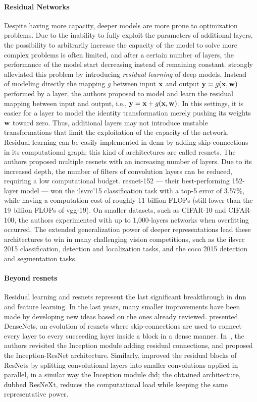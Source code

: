 \paragraph{Residual Networks}
Despite having more capacity, deeper models are more prone to optimization problems.
Due to the inability to fully exploit the parameters of additional layers, the possibility to arbitrarily increase the capacity of the model to solve more complex problems is often limited, and after a certain number of layers, the performance of the model start decreasing instead of remaining constant.
\citet{he2016deep} strongly alleviated this problem by introducing \emph{residual learning} of deep models.
Instead of modeling directly the mapping $g$ between input $\mathbf{x}$ and output $\mathbf{y} = g(\mathbf{x}, \mathbf{w})$ performed by a layer, the authors proposed to model and learn the residual mapping between input and output, i.e., $\mathbf{y} = \mathbf{x} + g(\mathbf{x}, \mathbf{w})$.
In this settings, it is easier for a layer to model the identity transformation merely pushing its weights $\mathbf{w}$ toward zero.
Thus, additional layers may not introduce unstable transformations that limit the exploitation of the capacity of the network.
Residual learning can be easily implemented in \gls{dcnn} by adding skip-connections in its computational graph;
this kind of architectures are called \glspl{resnet}.
The authors proposed multiple \glspl{resnet} with an increasing number of layers.
Due to its increased depth, the number of filters of convolution layers can be reduced, requiring a low computational budget.
\gls{resnet}-152 --- their best-performing 152-layer model --- won the \gls{ilsvrc}'15 classification task with a top-5 error of 3.57\%, while having a computation cost of roughly 11 billion FLOPs (still lower than the 19 billion FLOPs of \gls{vgg}-19).
On smaller datasets, such as CIFAR-10 and CIFAR-100, the authors experimented with up to 1,000-layers networks when overfitting occurred.
The extended generalization power of deeper representations lead these architectures to win in many challenging vision competitions, such as the \gls{ilsvrc} 2015 classification, detection and localization tasks, and the \acrshort{coco} 2015 detection and segmentation tasks.

\paragraph{Beyond \glspl{resnet}}
Residual learning and \glspl{resnet} represent the last significant breakthrough in \gls{dnn} and feature learning.
In the last years, many smaller improvements have been made by developing new ideas based on the ones already reviewed.
\citet{huang2017densely} presented DenseNets, an evolution of \glspl{resnet} where skip-connections are used to connect every layer to every succeeding layer inside a block in a dense manner.
In~\cite{szegedy2017inception}, the authors revisited the Inception module adding residual connections, and proposed the Inception-ResNet architecture.
Similarly, \citet{xie2017aggregated} improved the residual blocks of \glspl{ResNet} by splitting convolutional layers into smaller convolutions applied in parallel, in a similar way the Inception module did;
the obtained architecture, dubbed ResNeXt, reduces the computational load while keeping the same representative power.

